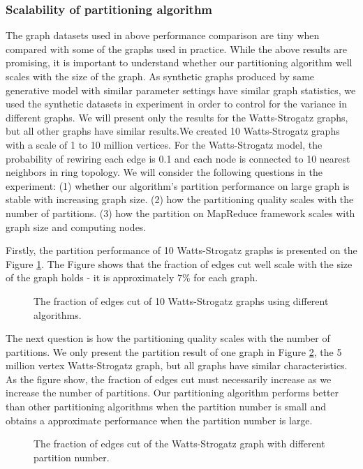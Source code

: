 \documentclass{acm_proc_article-sp}
\begin{document}
\subsubsection{Scalability of partitioning algorithm}
The graph datasets used in above performance comparison are tiny when compared with some of the graphs used in practice. While the above results are promising, it is important to understand whether our partitioning algorithm well scales with the size of the graph. As synthetic graphs produced by same generative model with similar parameter settings have similar graph statistics, we used the synthetic datasets in experiment in order to control for the variance in different graphs. We will present only the results for the Watts-Strogatz graphs, but all other graphs have similar results.We created 10 Watts-Strogatz graphs with a scale of 1 to 10 million vertices. For the Watts-Strogatz model, the probability of rewiring each edge is 0.1 and each node is connected to 10 nearest neighbors in ring topology. We will consider the following questions in the experiment: (1) whether our algorithm's partition performance on large graph is stable with increasing graph size. (2) how the partitioning quality scales with the number of partitions. (3) how the partition on MapReduce framework scales with graph size and computing nodes.
\par
Firstly, the partition performance of 10 Watts-Strogatz graphs is presented on the Figure \ref{fig:datasize}. The Figure shows that the fraction of edges cut well scale with the size of the graph holds - it is approximately $7\%$ for each graph.
\begin{figure}
\centering
{}
\caption{The fraction of edges cut of 10 Watts-Strogatz graphs using different algorithms.}
\label{fig:datasize}
\end{figure}

The next question is how the partitioning quality scales with the number of partitions. We only present the partition result of one graph in Figure \ref{fig:parNum}, the 5 million vertex Watts-Strogatz graph, but all graphs have similar characteristics. As the figure show, the fraction
of edges cut must necessarily increase as we increase the number of partitions. Our partitioning algorithm performs better than other partitioning algorithms when the partition number is small and obtains a approximate performance when the partition number is large.
\begin{figure}
\centering
{}
\caption{The fraction of edges cut of the Watts-Strogatz graph with different partition number.}
\label{fig:parNum}
\end{figure}
\end{document}
